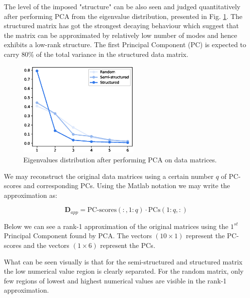 \documentclass[10pt,twocolumn]{article}
\begin{document}
The level of the imposed "structure" can be also seen and judged quantitatively after performing PCA from the eigenvalue distribution, presented in Fig. \ref{fig:eigenvalues}. The structured matrix has got the strongest decaying behaviour which suggest that the matrix can be approximated by relatively low number of modes and hence exhibits a low-rank structure. The first Principal Component (PC) is expected to carry 80\% of the total variance in the structured data matrix.

\begin{figure}[H]
\centering\includegraphics[width=6cm]{DWGs/matrix-reconstruction-eigenvalues-comparison.eps}
\caption{Eigenvalues distribution after performing PCA on data matrices.}			
\label{fig:eigenvalues}
\end{figure}

We may reconstruct the original data matrices using a certain number $q$ of PC-scores and corresponding PCs. Using the Matlab notation we may write the approximation as:

\begin{equation}
\bm{D}_{app} = \text{PC-scores}(:,1:q) \cdot \text{PCs}(1:q,:)
\end{equation}

Below we can see a rank-1 approximation of the original matrices using the $1^{st}$ Principal Component found by PCA. The vectors $(10 \times 1)$ represent the PC-scores and the vectors $(1 \times 6)$ represent the PCs.

What can be seen visually is that for the semi-structured and structured matrix the low numerical value region is clearly separated. For the random matrix, only few regions of lowest and highest numerical values are visible in the rank-1 approximation.
\end{document}
